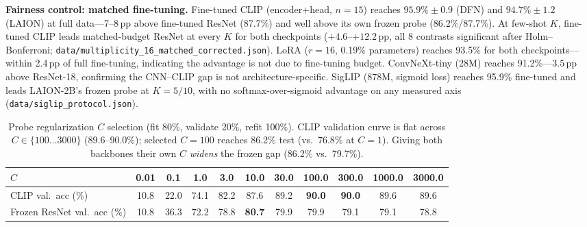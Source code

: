 \documentclass[10pt,a4paper]{article}
\begin{document}
\textbf{Fairness control: matched fine-tuning.} Fine-tuned CLIP (encoder+head, $n{=}15$) reaches $95.9\%\pm0.9$ (DFN) and $94.7\%\pm1.2$ (LAION) at full data---7--8\,pp above fine-tuned ResNet (87.7\%) and well above its own frozen probe (86.2\%/87.7\%). At few-shot $K$, fine-tuned CLIP leads matched-budget ResNet at every $K$ for both checkpoints ($+4.6$--$+12.2$\,pp, all 8 contrasts significant after Holm--Bonferroni; \texttt{data/multiplicity\_16\_matched\_corrected.json}). LoRA ($r{=}16$, 0.19\% parameters) reaches 93.5\% for both checkpoints---within 2.4\,pp of full fine-tuning, indicating the advantage is not due to fine-tuning budget. ConvNeXt-tiny (28M) reaches 91.2\%---$3.5$\,pp above ResNet-18, confirming the CNN--CLIP gap is not architecture-specific. SigLIP (878M, sigmoid loss) reaches 95.9\% fine-tuned and leads LAION-2B's frozen probe at $K{=}5/10$, with no softmax-over-sigmoid advantage on any measured axis (\texttt{data/siglip\_protocol.json}).

\begin{table}[!ht]
\centering
\caption{Probe regularization $C$ selection (fit 80\%, validate 20\%, refit 100\%). CLIP validation curve is flat across $C\in\{100{\ldots}3000\}$ (89.6--90.0\%); selected $C{=}100$ reaches 86.2\% test (vs.\ 76.8\% at $C{=}1$). Giving both backbones their own $C$ \emph{widens} the frozen gap (86.2\% vs.\ 79.7\%).}
\label{tab:cgrid}
{\footnotesize\setlength{\tabcolsep}{4pt}\begin{tabular}{lcccccccccc}
\toprule
$C$ & 0.01 & 0.1 & 1.0 & 3.0 & 10.0 & 30.0 & 100.0 & 300.0 & 1000.0 & 3000.0 \\
\midrule
CLIP val.\ acc (\%) & 10.8 & 22.0 & 74.1 & 82.2 & 87.6 & 89.2 & \textbf{90.0} & \textbf{90.0} & 89.6 & 89.6 \\
Frozen ResNet val.\ acc (\%) & 10.8 & 36.3 & 72.2 & 78.8 & \textbf{80.7} & 79.9 & 79.9 & 79.1 & 79.1 & 78.8 \\
\bottomrule
\end{tabular}}
\end{table}
\end{document}
